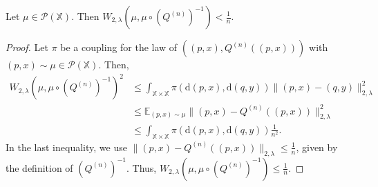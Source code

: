 \documentclass[11pt]{article}
\newcommand{\XX}{\mathbb{X}}
\newcommand{\EE}{\mathbb{E}}
\newcommand{\cP}{\mathcal{P}}
\newcommand{\de}{\mathrm{d}} %
\begin{document}
\begin{lemma}\label{lemma:approximate-measure}
    Let $\mu\in\cP(\XX)$. Then $W_{2,\lambda}(\mu,\mu\circ (Q^{(n)})^{-1}) < \frac{1}{n}$.
\end{lemma}
\begin{proof}
    Let $\pi$ be a coupling for the law of $((p,x), Q^{(n)}((p,x)))$ with $(p,x)\sim\mu\in\cP(\XX)$. Then,
    \begin{align*}
        W_{2,\lambda}(\mu,\mu\circ (Q^{(n)})^{-1})^2 &\leq \int_{\XX\times\XX}\pi(\de(p,x), \de (q,y))\|(p,x)-(q,y)\|_{2,\lambda}^2\\
        &\leq \EE_{(p,x)\sim\mu}\|(p,x)-Q^{(n)}((p,x))\|_{2,\lambda}^2\\
        &\leq \int_{\XX\times\XX}\pi(\de (p,x), \de (q,y))\frac{1}{n^2}.
    \end{align*}
    In the last inequality, we use $\|(p,x)-Q^{(n)}((p,x))\|_{2,\lambda} \leq \frac{1}{n}$, given by the definition of $(Q^{(n)})^{-1}$. Thus, $W_{2,\lambda}(\mu,\mu\circ (Q^{(n)})^{-1}) \leq \frac{1}{n}$.
\end{proof}
\end{document}
